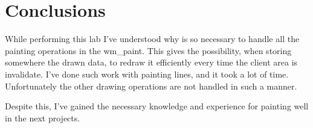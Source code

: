 \section*{Conclusions}

While performing this lab I've understood why is so necessary to handle all the painting operations in the wm_paint. This gives the possibility, when storing somewhere the drawn data, to redraw it efficiently every time the client area is invalidate. I've done such work with painting lines, and it took a lot of time. Unfortunately the other drawing operations are not handled in such a manner. 

Despite this, I've gained the necessary knowledge and experience for painting well in the next projects.

\clearpage